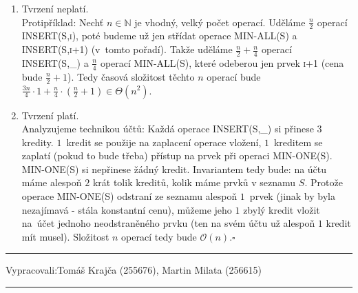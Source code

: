 \documentclass[12pt]{article}
\newcommand{\zadani}[2]{
{\large
\noindent {\bf IB108 \hfill{} Sada #1, Příklad #2 \\[-4mm]}
\noindent\hrule
\vspace{2mm}
\noindent Vypracovali:\hfill{}Tomáš Krajča (255676), Martin Milata (256615)
\vspace{3mm}
\hrule
\bigskip\bigskip}
}
\begin{document}
\begin{enumerate}
\item Tvrzení neplatí.\\
Protipříklad: Nechť $n \in \mathbb{N}$ je vhodný, velký počet operací. Uděláme
$\frac{n}{2}$ operací \textsc{INSERT(S,i)}, poté budeme už 
jen střídat operace \textsc{MIN-ALL(S)} a \textsc{INSERT(S,i+1)} (v~tomto
pořadí). Takže uděláme
$\frac{n}{2} + \frac{n}{4}$ operací \textsc{INSERT(S,\_)} a $\frac{n}{4}$
operací \textsc{MIN-ALL(S)}, které odeberou jen prvek \textsc{i+1} (cena bude
$\frac{n}{2}+1$). Tedy časová složitost těchto $n$ operací bude $\frac{3n}{4}\cdot 1 + \frac{n}{4}\cdot
\left(\frac{n}{2}+1\right) \in \Theta\left(n^2\right)$.

\item Tvrzení platí.\\
Analyzujeme technikou účtů: Každá operace \textsc{INSERT(S,\_)} si přinese $3$
kredity. $1$~kredit se použije na zaplacení operace vložení, $1$~kreditem se
zaplatí (pokud to bude třeba) přístup na prvek při operaci \textsc{MIN-ONE(S)}. \textsc{MIN-ONE(S)} si
nepřinese žádný kredit. Invariantem tedy bude:
na účtu máme alespoň $2$ krát tolik kreditů, kolik máme prvků v seznamu $S$. Protože
operace \textsc{MIN-ONE(S)} odstraní ze seznamu alespoň $1$~prvek (jinak by
 byla nezajímavá - stála konstantní cenu), můžeme jeho $1$ zbylý
kredit vložit na~účet jednoho neodstraněného prvku (ten na svém účtu už alespoň
$1$ kredit mít musel). Složitost $n$ operací tedy bude
$\mathcal{O}(n)$.\hfill$\square$
\end{enumerate}


\newpage
\zadani{1}{9}
\end{document}
